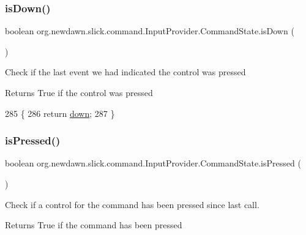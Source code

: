 \subsubsection{\texorpdfstring{is\+Down()}{isDown()}}
{\footnotesize\ttfamily boolean org.\+newdawn.\+slick.\+command.\+Input\+Provider.\+Command\+State.\+is\+Down (\begin{DoxyParamCaption}{ }\end{DoxyParamCaption})\hspace{0.3cm}{\ttfamily [inline]}}

Check if the last event we had indicated the control was pressed

\begin{DoxyReturn}{Returns}
True if the control was pressed 
\end{DoxyReturn}

\begin{DoxyCode}
285                                 \{
286             \textcolor{keywordflow}{return} \mbox{\hyperlink{classorg_1_1newdawn_1_1slick_1_1command_1_1_input_provider_1_1_command_state_a8cfa0dcf27d3c3a5f389bebea44da4b4}{down}};
287         \}
\end{DoxyCode}
\mbox{\label{classorg_1_1newdawn_1_1slick_1_1command_1_1_input_provider_1_1_command_state_a8216987ce9b6ed4abf545af323b341bc}} 
\subsubsection{\texorpdfstring{is\+Pressed()}{isPressed()}}
{\footnotesize\ttfamily boolean org.\+newdawn.\+slick.\+command.\+Input\+Provider.\+Command\+State.\+is\+Pressed (\begin{DoxyParamCaption}{ }\end{DoxyParamCaption})\hspace{0.3cm}{\ttfamily [inline]}}

Check if a control for the command has been pressed since last call.

\begin{DoxyReturn}{Returns}
True if the command has been pressed 
\end{DoxyReturn}

